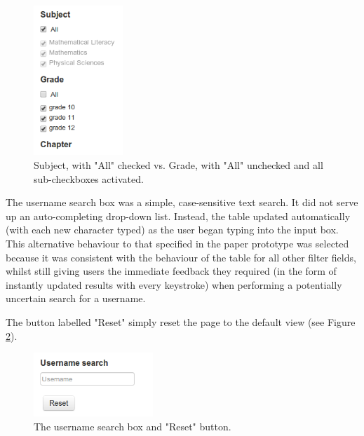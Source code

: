 \begin{figure}[h!]
    \centering
    \includegraphics[width=0.3\textwidth]{Figures/V1/alldeselected1.PNG}
 \caption{Subject, with "All" checked vs. Grade, with "All" unchecked and all sub-checkboxes activated.}
 \label{fig:checkboxes2}
\end{figure}

The username search box was a simple, case-sensitive text search. It did not serve up an auto-completing drop-down list. Instead, the table updated automatically (with each new character typed) as the user began typing into the input box. This alternative behaviour to that specified in the paper prototype was selected because it was consistent \citep[p. 261]{DixFinlay} with the behaviour of the table for all other filter fields, whilst still giving users the immediate feedback they required (in the form of instantly updated results with every keystroke) when performing a potentially uncertain search for a username. 

The button labelled "Reset" simply reset the page to the default view (see Figure \ref{fig:reset}). 
\begin{figure}[h!]
    \centering
    \includegraphics[width=0.4\textwidth]{Figures/V1/usernameReset.png}
 \caption{The username search box and "Reset" button.}
 \label{fig:reset}

\end{figure}

